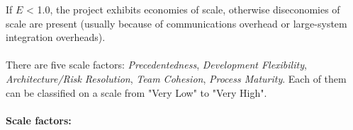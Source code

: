 \documentclass[english]{article}
\begin{document}
If $E$ < 1.0, the project exhibits economies of scale, otherwise diseconomies of scale are present (usually because of communications overhead or large-system integration overheads).

\paragraph{}
There are five scale factors: \textit{Precedentedness}, \textit{Development Flexibility}, \textit{Architecture/Risk Resolution}, \textit{Team Cohesion}, \textit{Process Maturity}. Each of them can be classified on a scale from "Very Low" to "Very High".



\paragraph{Scale factors:}
\end{document}
